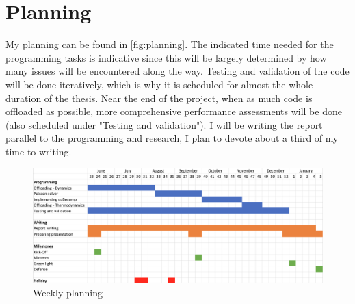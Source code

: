 \section{Planning}
My planning can be found in \autoref{fig:planning}. The indicated time needed for the programming tasks is indicative since this will be largely determined by how many issues will be encountered along the way. Testing and validation of the code will be done iteratively, which is why it is scheduled for almost the whole duration of the thesis. Near the end of the project, when as much code is offloaded as possible, more comprehensive performance assessments will be done (also scheduled under "Testing and validation"). I will be writing the report parallel to the programming and research, I plan to devote about a third of my time to writing. 

\begin{figure}[H]
    \centering
    \includegraphics[width=\textwidth]{doc/images/planning.png}
    \caption{Weekly planning}
    \label{fig:planning}
\end{figure}
